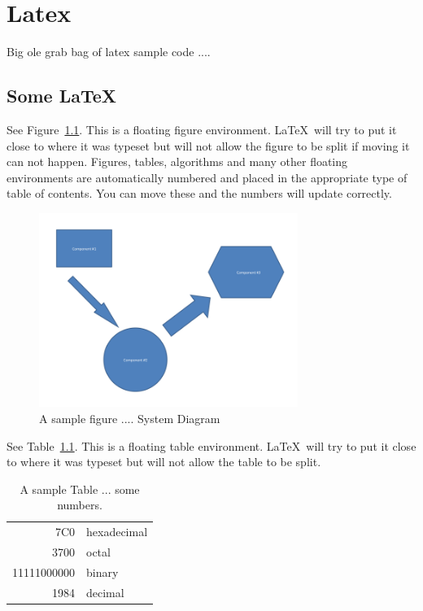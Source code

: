 
\chapter{Latex}
Big ole grab bag of latex sample code ....


\section{Some \LaTeX\ }

See Figure~\ref{systemdiagram}.  This is a floating
figure environment.  \LaTeX\ will try to put it close to where it was
typeset but will not allow the figure to be split if moving it can not
happen.  Figures, tables, algorithms and many other floating
environments are automatically numbered and placed in the appropriate
type of table of contents.  You can move these and the numbers will
update correctly.

\begin{figure}[tbh]
\begin{center}
\includegraphics[width=0.75\textwidth]{./diagram}
\end{center}
\caption{A sample figure .... System Diagram \label{systemdiagram}}
\end{figure}




See Table~\ref{somenumbers}.  This is a floating table environment.
\LaTeX\ will try to put it close to where it was typeset but will not
allow the table to be split.

\begin{table}[tbh]
\caption{A sample Table ... some numbers. \label{somenumbers}}
\begin{center}
\begin{tabular}{|r|l|}
  \hline
  7C0 & hexadecimal \\
  3700 & octal \\ \cline{2-2}
  11111000000 & binary \\
  \hline \hline
  1984 & decimal \\
  \hline
\end{tabular}
\end{center}
\end{table}

